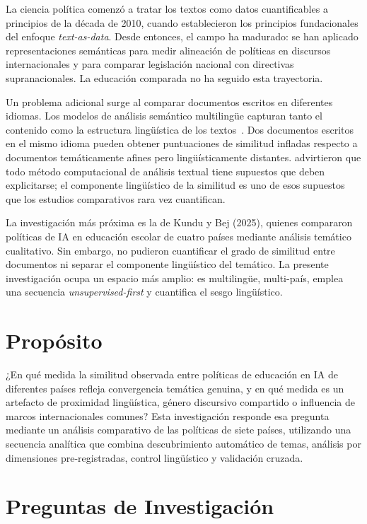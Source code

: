 La ciencia política comenzó a tratar los textos como datos cuantificables a principios de la década de 2010, cuando \citet{grimmer2013text} establecieron los principios fundacionales del enfoque \textit{text-as-data}. Desde entonces, el campo ha madurado: se han aplicado representaciones semánticas para medir alineación de políticas en discursos internacionales y para comparar legislación nacional con directivas supranacionales. La educación comparada no ha seguido esta trayectoria.

Un problema adicional surge al comparar documentos escritos en diferentes idiomas. Los modelos de análisis semántico multilingüe capturan tanto el contenido como la estructura lingüística de los textos~\citep{conneau2020unsupervised}. Dos documentos escritos en el mismo idioma pueden obtener puntuaciones de similitud infladas respecto a documentos temáticamente afines pero lingüísticamente distantes. \citet{grimmer2013text} advirtieron que todo método computacional de análisis textual tiene supuestos que deben explicitarse; el componente lingüístico de la similitud es uno de esos supuestos que los estudios comparativos rara vez cuantifican.

La investigación más próxima es la de Kundu y Bej (2025), quienes compararon políticas de IA en educación escolar de cuatro países mediante análisis temático cualitativo. Sin embargo, no pudieron cuantificar el grado de similitud entre documentos ni separar el componente lingüístico del temático. La presente investigación ocupa un espacio más amplio: es multilingüe, multi-país, emplea una secuencia \textit{unsupervised-first} y cuantifica el sesgo lingüístico.


\section{Propósito}
\label{sec:proposito}

¿En qué medida la similitud observada entre políticas de educación en IA de diferentes países refleja convergencia temática genuina, y en qué medida es un artefacto de proximidad lingüística, género discursivo compartido o influencia de marcos internacionales comunes? Esta investigación responde esa pregunta mediante un análisis comparativo de las políticas de siete países, utilizando una secuencia analítica que combina descubrimiento automático de temas, análisis por dimensiones pre-registradas, control lingüístico y validación cruzada.


\section{Preguntas de Investigación}
\label{sec:preguntas}

